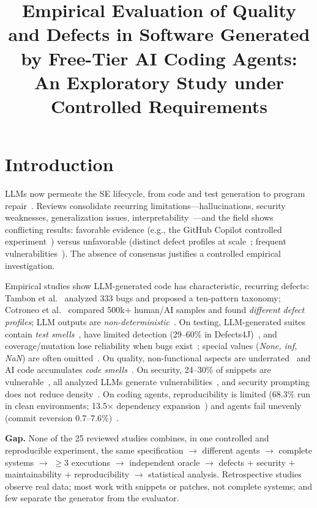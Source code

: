 \documentclass[sigconf,anonymous]{acmart}
\title{Empirical Evaluation of Quality and Defects in Software Generated by Free-Tier AI Coding Agents: An Exploratory Study under Controlled Requirements}
\begin{document}
\maketitle

\section{Introduction}
LLMs now permeate the SE lifecycle, from code and test generation to program repair~\cite{A01}. Reviews consolidate recurring limitations---hallucinations, security weaknesses, generalization issues, interpretability~\cite{A02}---and the field shows conflicting results: favorable evidence (e.g., the GitHub Copilot controlled experiment~\cite{D03}) versus unfavorable (distinct defect profiles at scale~\cite{B03}; frequent vulnerabilities~\cite{E01}). The absence of consensus justifies a controlled empirical investigation.

Empirical studies show LLM-generated code has characteristic, recurring defects: Tambon et al.~\cite{B01} analyzed 333 bugs and proposed a ten-pattern taxonomy; Cotroneo et al.~\cite{B03} compared 500k+ human/AI samples and found \emph{different defect profiles}; LLM outputs are \emph{non-deterministic}~\cite{B04}. On testing, LLM-generated suites contain \emph{test smells}~\cite{C03}, have limited detection (29--60\% in Defects4J)~\cite{C04}, and coverage/mutation lose reliability when bugs exist~\cite{C05}; special values (\emph{None, inf, NaN}) are often omitted~\cite{C06}. On quality, non-functional aspects are underrated~\cite{D04} and AI code accumulates \emph{code smells}~\cite{D05}. On security, 24--30\% of snippets are vulnerable~\cite{E01}, all analyzed LLMs generate vulnerabilities~\cite{E02}, and security prompting does not reduce density~\cite{E03}. On coding agents, reproducibility is limited (68.3\% run in clean environments; 13.5$\times$ dependency expansion~\cite{F02}) and agents fail unevenly (commit reversion 0.7--7.6\%)~\cite{F05}.

\textbf{Gap.} None of the 25 reviewed studies combines, in one controlled and reproducible experiment, the same specification $\rightarrow$ different agents $\rightarrow$ complete systems $\rightarrow$ $\ge$3 executions $\rightarrow$ independent oracle $\rightarrow$ defects $+$ security $+$ maintainability $+$ reproducibility $\rightarrow$ statistical analysis. Retrospective studies observe real data; most work with snippets or patches, not complete systems; and few separate the generator from the evaluator.
\end{document}
